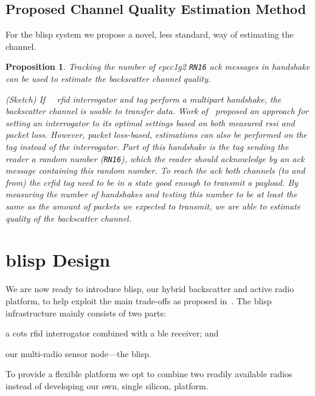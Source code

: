 \documentclass[conference,letterpaper,twoside,final,10pt]{IEEEtran}
\newtheorem{proposition}{Proposition}
\begin{document}
\subsection{Proposed Channel Quality Estimation Method}
\label{sec:feedforward}

For the \acs{blisp} system we propose a novel, less standard, way of estimating the channel.
\begin{proposition}
Tracking the number of \ac{epcc1g2} \texttt{RN16} \ac{ack} messages in handshake can be used to estimate the backscatter channel quality.
\begin{IEEEproof}
(Sketch) If {~~}\ac{rfid} interrogator and tag perform a multipart handshake, the backscatter channel is usable to transfer data.
Work of~\cite{zhang2012mobisys} proposed an approach for setting an interrogator to its optimal settings based on both measured \ac{rssi} and packet loss.
However, packet loss-based, estimations can also be performed on the tag instead of the interrogator.
Part of this handshake is the tag sending the reader a random number (\texttt{RN16}), which the reader should acknowledge by an \ac{ack} message containing this random number.
To reach the \ac{ack} both channels (to and from) the \ac{crfid} tag need to be in a state good enough to transmit a payload.
By measuring the number of handshakes and testing this number to be at least the same as the amount of packets we expected to transmit, we are able to estimate quality of the backscatter channel.
\end{IEEEproof}
\end{proposition}

\section{\acs{blisp} Design}
\label{sec:blisp_design}

We are now ready to introduce \ac{blisp}, our hybrid backscatter and active radio platform, to help exploit the main trade-offs as proposed in~. 
The \ac{blisp} infrastructure mainly consists of two parts:
\begin{enumerate*}[label=(\roman*)]
	\item 	a \ac{cots} \acs{rfid} interrogator combined with a \ac{ble} receiver; and
	\item 	our multi-radio sensor node---the \ac{blisp}.
\end{enumerate*}
To provide a flexible platform we opt to combine two readily available radios instead of developing our own, single silicon, platform.
\end{document}
